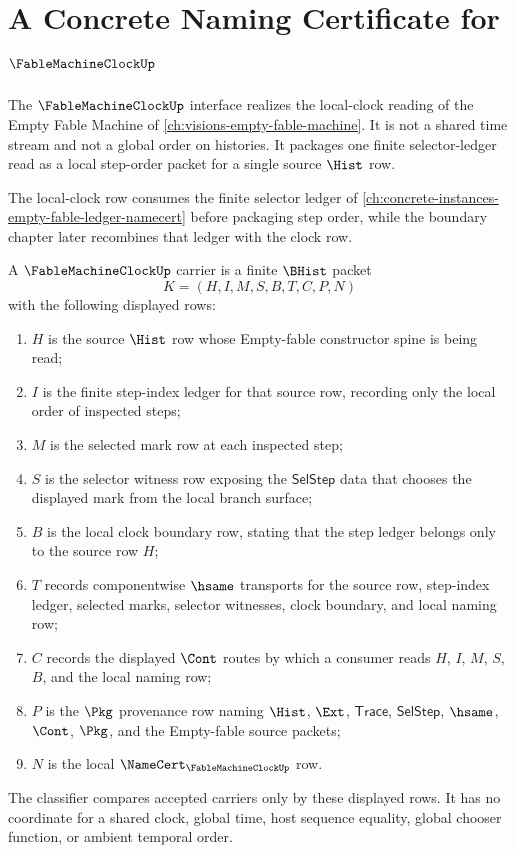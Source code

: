 \chapter{A Concrete Naming Certificate for $\FableMachineClockUp$}
\label{ch:concrete-instances-fablemachineclock-namecert}

The $\FableMachineClockUp$ interface realizes the local-clock reading of the Empty Fable Machine of \autoref{ch:visions-empty-fable-machine}. It is not a shared time stream and not a global order on histories. It packages one finite selector-ledger read as a local step-order packet for a single source $\Hist$ row.

The local-clock row consumes the finite selector ledger of \autoref{ch:concrete-instances-empty-fable-ledger-namecert} before packaging step order, while the boundary chapter later recombines that ledger with the clock row.

\begin{definition}
\label{def:fable-machine-clock-carrier}
A $\FableMachineClockUp$ carrier is a finite $\BHist$ packet
$$
K=(H,I,M,S,B,T,C,P,N)
$$
with the following displayed rows:
\begin{enumerate}
\item $H$ is the source $\Hist$ row whose Empty-fable constructor spine is being read;
\item $I$ is the finite step-index ledger for that source row, recording only the local order of inspected steps;
\item $M$ is the selected mark row at each inspected step;
\item $S$ is the selector witness row exposing the $\mathsf{SelStep}$ data that chooses the displayed mark from the local branch surface;
\item $B$ is the local clock boundary row, stating that the step ledger belongs only to the source row $H$;
\item $T$ records componentwise $\hsame$ transports for the source row, step-index ledger, selected marks, selector witnesses, clock boundary, and local naming row;
\item $C$ records the displayed $\Cont$ routes by which a consumer reads $H$, $I$, $M$, $S$, $B$, and the local naming row;
\item $P$ is the $\Pkg$ provenance row naming $\Hist$, $\Ext$, $\mathsf{Trace}$, $\mathsf{SelStep}$, $\hsame$, $\Cont$, $\Pkg$, and the Empty-fable source packets;
\item $N$ is the local $\NameCert_{\FableMachineClockUp}$ row.
\end{enumerate}
The classifier compares accepted carriers only by these displayed rows. It has no coordinate for a shared clock, global time, host sequence equality, global chooser function, or ambient temporal order.
\end{definition}


